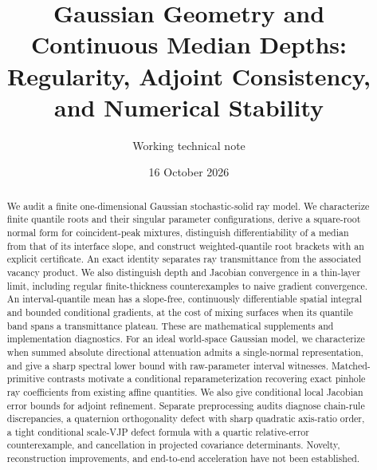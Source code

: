 \documentclass[11pt,a4paper]{article}
\title{Gaussian Geometry and Continuous Median Depths:\\
Regularity, Adjoint Consistency, and Numerical Stability}
\author{Working technical note}
\date{16 October 2026}
\begin{document}
\maketitle
\begin{abstract}
We audit a finite one-dimensional Gaussian stochastic-solid ray model.
We characterize finite quantile roots and their singular parameter configurations,
derive a square-root normal form for coincident-peak mixtures, distinguish
differentiability of a median from that of its interface slope, and construct
weighted-quantile root brackets with an explicit certificate.
An exact identity separates ray transmittance from the associated vacancy product.
We also distinguish depth and Jacobian convergence in a thin-layer limit,
including regular finite-thickness counterexamples to naive gradient convergence.
An interval-quantile mean has a slope-free, continuously differentiable spatial
integral and bounded conditional gradients, at the cost of mixing surfaces
when its quantile band spans a transmittance plateau.
These are mathematical supplements and implementation diagnostics.
For an ideal world-space Gaussian model, we characterize when summed
absolute directional attenuation admits a single-normal representation,
and give a sharp spectral lower bound with raw-parameter interval witnesses.
Matched-primitive contrasts motivate a conditional reparameterization
recovering exact pinhole ray coefficients from existing affine quantities.
We also give conditional local Jacobian error bounds for adjoint refinement.
Separate preprocessing audits diagnose chain-rule discrepancies, a
quaternion orthogonality defect with sharp quadratic axis-ratio order,
a tight conditional scale-VJP defect formula with a quartic relative-error
counterexample, and cancellation in projected covariance determinants.
Novelty, reconstruction improvements, and end-to-end acceleration have not been established.
\end{abstract}
\end{document}
